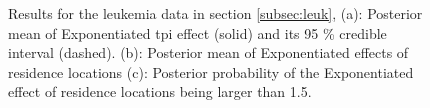 \documentclass[ba]{imsart}
\begin{document}
  \begin{figure}[ht]
    \centering
    \caption{Results for the leukemia data in section \ref{subsec:leuk}, (a): Posterior mean of Exponentiated tpi effect (solid) and its 95 \% credible interval (dashed). (b): Posterior mean of Exponentiated effects of residence locations (c): Posterior probability of the Exponentiated effect of residence locations being larger than 1.5.}
    \label{fig:leukFig}
    \end{figure}
    
\end{document}
